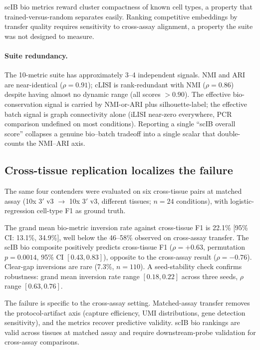 \documentclass[11pt]{article}
\begin{document}
scIB bio metrics reward cluster compactness of known cell types, a property that trained-versus-random separates easily. Ranking competitive embeddings by transfer quality requires sensitivity to cross-assay alignment, a property the suite was not designed to measure.

\paragraph{Suite redundancy.} The 10-metric suite has approximately 3--4 independent signals. NMI and ARI are near-identical ($\rho = 0.91$); cLISI is rank-redundant with NMI ($\rho = 0.86$) despite having almost no dynamic range (all scores $> 0.90$). The effective bio-conservation signal is carried by NMI-or-ARI plus silhouette-label; the effective batch signal is graph connectivity alone (iLISI near-zero everywhere, PCR comparison undefined on most conditions). Reporting a single ``scIB overall score'' collapses a genuine bio--batch tradeoff into a single scalar that double-counts the NMI--ARI axis.


\subsection{Cross-tissue replication localizes the failure}
\label{sec:crosstissue}

The same four contenders were evaluated on six cross-tissue pairs at matched assay (10x 3$'$ v3 $\rightarrow$ 10x 3$'$ v3, different tissues; $n = 24$ conditions), with logistic-regression cell-type F1 as ground truth.

The grand mean bio-metric inversion rate against cross-tissue F1 is 22.1\% [95\% CI: 13.1\%, 34.9\%], well below the 46--58\% observed on cross-assay transfer. The scIB bio composite positively predicts cross-tissue F1 ($\rho = +0.63$, permutation $p = 0.0014$, 95\% CI $[0.43, 0.83]$), opposite to the cross-assay result ($\rho = -0.76$). Clear-gap inversions are rare (7.3\%, $n = 110$). A seed-stability check confirms robustness: grand mean inversion rate range $[0.18, 0.22]$ across three seeds, $\rho$ range $[0.63, 0.76]$.

The failure is specific to the cross-assay setting. Matched-assay transfer removes the protocol-artifact axis (capture efficiency, UMI distributions, gene detection sensitivity), and the metrics recover predictive validity. scIB bio rankings are valid across tissues at matched assay and require downstream-probe validation for cross-assay comparisons.
\end{document}

